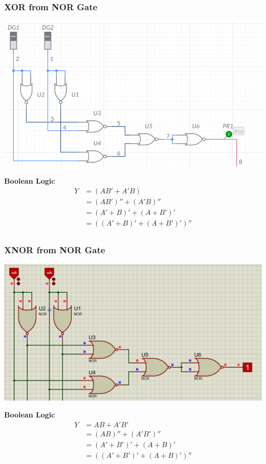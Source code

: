 \documentclass[a4paper, 12pt]{article}
\begin{document}
\subsubsection{XOR from NOR Gate}
\begin{center}
  \includegraphics[scale=0.5]{nor-xor}
\end{center}
\textbf{Boolean Logic}
\begin{equation} \label{eq1}
\begin{split}
  Y & = (AB' + A'B) \\
    & = (AB')'' + (A'B)''  \\
    & = (A' + B)' + (A + B')' \\
    & = ((A' + B)' + (A + B')')'' \\
\end{split}
\end{equation}

\subsubsection{XNOR from NOR Gate}
\begin{center}
  \includegraphics[scale=0.5]{nor-xnor}
\end{center}
\textbf{Boolean Logic}
\begin{equation} 
\begin{split}
  Y & = AB + A'B'\\
    & = (AB)'' + (A'B')'' \\
    & = (A' + B')' + (A + B)' \\
    & = ((A' + B')' + (A + B)')'' \\
\end{split}
\end{equation}
\end{document}
